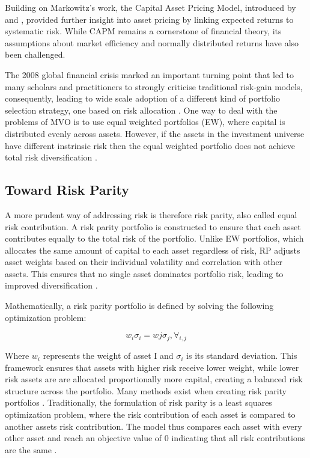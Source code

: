 \documentclass[preprint, 3p,
authoryear]{elsarticle} %
\begin{document}
Building on Markowitz's work, the Capital Asset Pricing Model,
introduced by \citet{sharpe1964} and \citet{mossin1966}, provided
further insight into asset pricing by linking expected returns to
systematic risk. While CAPM remains a cornerstone of financial theory,
its assumptions about market efficiency and normally distributed returns
have also been challenged.

The 2008 global financial crisis marked an important turning point that
led to many scholars and practitioners to strongly criticise traditional
risk-gain models, consequently, leading to wide scale adoption of a
different kind of portfolio selection strategy, one based on risk
allocation \citep{ararat2024}. One way to deal with the problems of MVO
is to use equal weighted portfolios (EW), where capital is distributed
evenly across assets. However, if the assets in the investment universe
have different instrinsic risk then the equal weighted portfolio does
not achieve total risk diversification \citep{ararat2024}.

\hypertarget{toward-risk-parity}{%
\subsection{Toward Risk Parity}\label{toward-risk-parity}}

A more prudent way of addressing risk is therefore risk parity, also
called equal risk contribution. A risk parity portfolio is constructed
to ensure that each asset contributes equally to the total risk of the
portfolio. Unlike EW portfolios, which allocates the same amount of
capital to each asset regardless of risk, RP adjusts asset weights based
on their individual volatility and correlation with other assets. This
ensures that no single asset dominates portfolio risk, leading to
improved diversification \citep{maillard2010}.

Mathematically, a risk parity portfolio is defined by solving the
following optimization problem:

\[
w_i\sigma_i = wj\sigma_j, \forall_{i,j}
\]

Where \(w_i\) represents the weight of asset I and \(\sigma_i\) is its
standard deviation. This framework ensures that assets with higher risk
receive lower weight, while lower risk assets are are allocated
proportionally more capital, creating a balanced risk structure across
the portfolio. Many methods exist when creating risk parity portfolios
\citep{feng2015}. Traditionally, the formulation of risk parity is a
least squares optimization problem, where the risk contribution of each
asset is compared to another assets risk contribution. The model thus
compares each asset with every other asset and reach an objective value
of 0 indicating that all risk contributions are the same
\citep{gambeta2020}.
\end{document}
